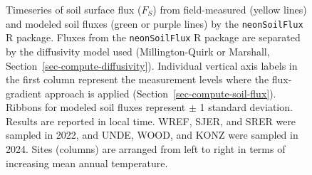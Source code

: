 \documentclass[
  letterpaper,
  DIV=11,
  numbers=noendperiod]{scrartcl}
\begin{document}
\begin{figure}


\caption{\label{fig-flux-results}Timeseries of soil surface flux
(\(F_{S}\)) from field-measured (yellow lines) and modeled soil fluxes
(green or purple lines) by the \texttt{neonSoilFlux} R package. Fluxes
from the \texttt{neonSoilFlux} R package are separated by the
diffusivity model used (Millington-Quirk or Marshall,
Section~\ref{sec-compute-diffusivity}). Individual vertical axis labels
in the first column represent the measurement levels where the
flux-gradient approach is applied (Section~\ref{sec-compute-soil-flux}).
Ribbons for modeled soil fluxes represent \(\pm\) 1 standard deviation.
Results are reported in local time. WREF, SJER, and SRER were sampled in
2022, and UNDE, WOOD, and KONZ were sampled in 2024. Sites (columns) are
arranged from left to right in terms of increasing mean annual
temperature.}

\end{figure}%
\end{document}
